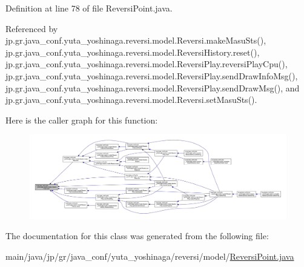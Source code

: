 Definition at line 78 of file Reversi\+Point.\+java.



Referenced by jp.\+gr.\+java\+\_\+conf.\+yuta\+\_\+yoshinaga.\+reversi.\+model.\+Reversi.\+make\+Masu\+Sts(), jp.\+gr.\+java\+\_\+conf.\+yuta\+\_\+yoshinaga.\+reversi.\+model.\+Reversi\+History.\+reset(), jp.\+gr.\+java\+\_\+conf.\+yuta\+\_\+yoshinaga.\+reversi.\+model.\+Reversi\+Play.\+reversi\+Play\+Cpu(), jp.\+gr.\+java\+\_\+conf.\+yuta\+\_\+yoshinaga.\+reversi.\+model.\+Reversi\+Play.\+send\+Draw\+Info\+Msg(), jp.\+gr.\+java\+\_\+conf.\+yuta\+\_\+yoshinaga.\+reversi.\+model.\+Reversi\+Play.\+send\+Draw\+Msg(), and jp.\+gr.\+java\+\_\+conf.\+yuta\+\_\+yoshinaga.\+reversi.\+model.\+Reversi.\+set\+Masu\+Sts().

Here is the caller graph for this function\+:
\nopagebreak
\begin{figure}[H]
\begin{center}
\leavevmode
\includegraphics[width=350pt]{classjp_1_1gr_1_1java__conf_1_1yuta__yoshinaga_1_1reversi_1_1model_1_1_reversi_point_a7ba3fb3aedb0d02d79ec62f4645bb8cf_icgraph}
\end{center}
\end{figure}


The documentation for this class was generated from the following file\+:\begin{DoxyCompactItemize}
\item 
main/java/jp/gr/java\+\_\+conf/yuta\+\_\+yoshinaga/reversi/model/\hyperlink{_reversi_point_8java}{Reversi\+Point.\+java}\end{DoxyCompactItemize}
